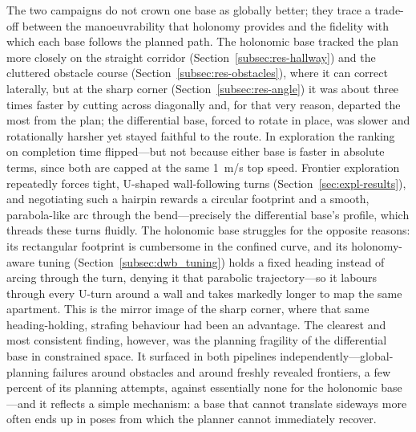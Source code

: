 The two campaigns do not crown one base as globally better; they trace a trade-off between the
manoeuvrability that holonomy provides and the fidelity with which each base follows the planned
path. The holonomic base tracked the plan more closely on the straight corridor
(Section~\ref{subsec:res-hallway}) and the cluttered obstacle course
(Section~\ref{subsec:res-obstacles}), where it can correct laterally, but at the sharp corner
(Section~\ref{subsec:res-angle}) it was about three times faster by cutting across diagonally and,
for that very reason, departed the most from the plan; the differential base, forced to rotate in
place, was slower and rotationally harsher yet stayed faithful to the route. 
In exploration the ranking on completion time flipped---but not because either base is faster in
absolute terms, since both are capped at the same 1~m/s top speed. Frontier exploration repeatedly
forces tight, U-shaped wall-following turns (Section~\ref{sec:expl-results}), and negotiating such
a hairpin rewards a circular footprint and a smooth, parabola-like arc through the bend---precisely
the differential base's profile, which threads these turns fluidly. The holonomic base struggles
for the opposite reasons: its rectangular footprint is cumbersome in the confined curve, and its
holonomy-aware tuning (Section~\ref{subsec:dwb_tuning}) holds a fixed heading instead of arcing
through the turn, denying it that parabolic trajectory---so it labours through every U-turn around a wall and
takes markedly longer to map the same apartment. This is the mirror image of the sharp corner,
where that same heading-holding, strafing behaviour had been an advantage.
The clearest and most consistent finding, however, was the planning fragility of
the differential base in constrained space. It surfaced in both pipelines
independently---global-planning failures around obstacles and around freshly revealed frontiers, a
few percent of its planning attempts, against essentially none for the holonomic base---and it
reflects a simple mechanism: a base that cannot translate sideways more often ends up in poses
from which the planner cannot immediately recover.


